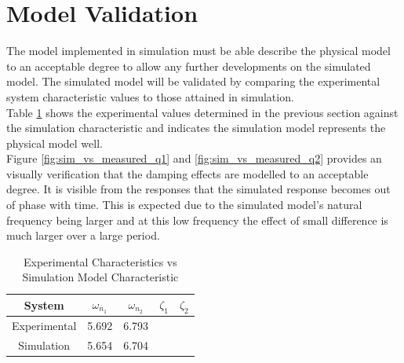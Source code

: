 \section{Model Validation}
The model implemented in simulation must be able describe the physical model to an acceptable degree to allow any further developments on the simulated model. The simulated model will be validated by comparing the experimental system characteristic values to those attained in simulation.\\

Table \ref{table:experiment_vs_simulation} shows the experimental values determined in the previous section against the simulation characteristic and indicates the simulation model represents the physical model well.\\

Figure \ref{fig:sim_vs_measured_q1} and \ref{fig:sim_vs_measured_q2} provides an visually verification that the damping effects are modelled to an acceptable degree. It is visible from the responses that the simulated response becomes out of phase with time. This is expected due to the simulated model's natural frequency being larger and at this low frequency the effect of small difference is much larger over a large period. \\


\begin{table}[]
	\centering
	\begin{tabular}{|c|c|c|c|c|}
		\hline
		System & $\omega_{n_{1}}$  & $\omega_{n_{2}}$  & $\zeta_{1}$ & $\zeta_{2}$ \\
		\hline
		\hline
		Experimental  & 5.692 &  6.793 & & \\
		\hline
		Simulation & 5.654 & 6.704 & & \\ 
		\hline
	\end{tabular}
	\caption{Experimental Characteristics vs Simulation Model Characteristic}
	\label{table:experiment_vs_simulation}
\end{table}

